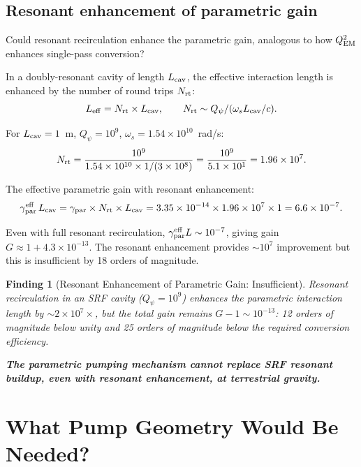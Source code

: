 \documentclass[11pt]{article}
\newtheorem{finding}{Finding}
\newcommand{\ee}[1]{\times 10^{#1}}
\newcommand{\Qpsi}{Q_\psi}
\begin{document}
\subsection{Resonant enhancement of parametric gain}

Could resonant recirculation enhance the parametric gain, analogous to
how $Q_{\rm EM}^2$ enhances single-pass conversion?

In a doubly-resonant cavity of length $L_{\rm cav}$, the effective
interaction length is enhanced by the number of round trips $N_{\rm rt}$:
\begin{equation}
L_{\rm eff} = N_{\rm rt}\times L_{\rm cav},\qquad
N_{\rm rt} \sim \Qpsi/(\omega_s L_{\rm cav}/c).
\end{equation}

For $L_{\rm cav} = 1$~m, $\Qpsi = 10^9$, $\omega_s = 1.54\ee{10}$~rad/s:
\begin{equation}
N_{\rm rt} = \frac{10^9}{1.54\ee{10}\times 1/(3\ee{8})}
= \frac{10^9}{5.1\ee{1}} = 1.96\ee{7}.
\end{equation}

The effective parametric gain with resonant enhancement:
\begin{equation}
\gamma_{\rm par}^{\rm eff}\,L_{\rm cav}
= \gamma_{\rm par}\times N_{\rm rt}\times L_{\rm cav}
= 3.35\ee{-14}\times 1.96\ee{7}\times 1
= 6.6\ee{-7}.
\end{equation}

Even with full resonant recirculation, $\gamma_{\rm par}^{\rm eff}L \sim
10^{-7}$, giving gain $G \approx 1 + 4.3\ee{-13}$. The resonant
enhancement provides $\sim 10^7$ improvement but this is insufficient
by 18 orders of magnitude.

\begin{finding}[Resonant Enhancement of Parametric Gain: Insufficient]
\label{find:resonant-parametric}
Resonant recirculation in an SRF cavity ($\Qpsi = 10^9$) enhances the
parametric interaction length by $\sim 2\ee{7}\times$, but the total
gain remains $G - 1 \sim 10^{-13}$: 12 orders of magnitude below unity
and 25 orders of magnitude below the required conversion efficiency.

\textbf{The parametric pumping mechanism cannot replace SRF resonant
buildup, even with resonant enhancement, at terrestrial gravity.}
\end{finding}

\section{What Pump Geometry Would Be Needed?}
\label{sec:pump-geometry}
\end{document}
